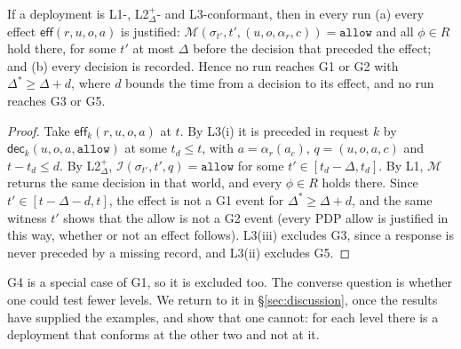 \documentclass[sigconf,review,anonymous]{acmart}
\newcommand{\allowv}{\mathtt{allow}}
\newcommand{\ev}[1]{\mathsf{#1}}
\begin{document}
\begin{theorem}[Composition]\label{thm:compose}
If a deployment is L1-, L2$^+_\Delta$- and L3-conformant, then in every run (a) every effect $\ev{eff}(r,u,o,a)$ is
justified: $\mathcal{M}(\sigma_{t'},t',(u,o,\alpha_r,c))=\allowv$ and all $\phi\in R$ hold there, for some $t'$
at most $\Delta$ before the decision that preceded the effect; and (b) every decision is recorded. Hence no run
reaches G1 or G2 with $\Delta^\ast\ge\Delta+\mathit{d}$, where $\mathit{d}$ bounds the time from a decision to its
effect, and no run reaches G3 or G5.
\end{theorem}
\begin{proof}
Take $\ev{eff}_k(r,u,o,a)$ at $t$. By L3(i) it is preceded in request $k$ by $\ev{dec}_k(u,o,a,\allowv)$ at some
$t_d\le t$, with $a=\alpha_r(a_c)$, $q=(u,o,a,c)$ and $t-t_d\le\mathit{d}$. By L2$^+_\Delta$,
$\mathcal{I}(\sigma_{t'},t',q)=\allowv$ for some $t'\in[t_d-\Delta,t_d]$. By L1, $\mathcal{M}$ returns the same
decision in that world, and every $\phi\in R$ holds there. Since $t'\in[t-\Delta-\mathit{d},t]$, the effect is not a
G1 event for $\Delta^\ast\ge\Delta+\mathit{d}$, and the same witness $t'$ shows that the allow is not a G2 event
(every PDP allow is justified in this way, whether or not an effect follows). L3(iii) excludes G3, since a
response is never preceded by a missing record, and L3(ii) excludes G5.
\end{proof}

G4 is a special case of G1, so it is excluded too. The converse question is whether one could test fewer
levels. We return to it in \S\ref{sec:discussion}, once the results have supplied the examples, and show that one
cannot: for each level there is a deployment that conforms at the other two and not at it.
\end{document}
